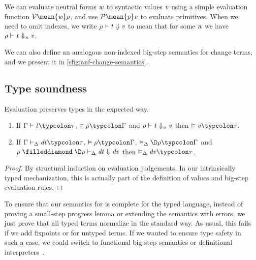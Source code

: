 We can evaluate neutral forms \ensuremath{\Varid{w}} to syntactic values \ensuremath{\Varid{v}} using a simple
evaluation function \ensuremath{\mathcal{V}\mean{\Varid{w}}\rho}, and use \ensuremath{\mathcal{P}\mean{\Varid{p}}\Varid{v}} to
evaluate primitives.
When we need to omit indexes, we write \ensuremath{\rho\vdash\Varid{t}\Downarrow\Varid{v}} to mean
that for some \ensuremath{\Varid{n}} we have \ensuremath{\rho\vdash\Varid{t}\Downarrow_{\Varid{n}}\Varid{v}}.

We can also define an analogous non-indexed big-step
semantics for change terms, and we present it in \cref{sfig:anf-change-semantics}.

\subsection{Type soundness}
\label{sec:bsos-anf-soundness}

Evaluation preserves types in the expected way.
\begin{lemma}
  \begin{enumerate}
  \item If \ensuremath{\Gamma\vdash\Varid{t}\typcolon\tau}, \ensuremath{\vDash\rho\typcolon\Gamma} and \ensuremath{\rho\vdash\Varid{t}\Downarrow_{\Varid{n}}\Varid{v}} then
\ensuremath{\vDash\Varid{v}\typcolon\tau}.
\item If \ensuremath{\Gamma\vdash_{\Delta}\Varid{dt}\typcolon\tau}, \ensuremath{\vDash\rho\typcolon\Gamma}, \ensuremath{\vDash_{\Delta}\D\rho\typcolon\Gamma} and
\ensuremath{\rho\mathrel{\filleddiamond}\D\rho\vdash_{\Delta}\Varid{dt}\Downarrow\Varid{dv}} then \ensuremath{\vDash_{\Delta}\Varid{dv}\typcolon\tau}.
   \end{enumerate}
\end{lemma}
\begin{proof}
  By structural induction on evaluation judgements. In our intrinsically typed
  mechanization, this is actually part of the definition of values and big-step
  evaluation rules.
\end{proof}

To ensure that our semantics for \ilcTau{} is complete for the typed language,
instead of proving a small-step progress lemma or extending the semantics with
errors, we just prove that all typed terms normalize in the standard way.
As usual, this fails if we add fixpoints or for untyped terms. If we wanted to
ensure type safety in such a case, we could switch to functional big-step
semantics or definitional interpreters~\citep{Amin2017Type,Owens2016functional}.

